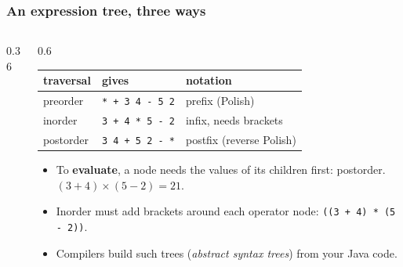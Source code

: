 \documentclass[aspectratio=169,10pt,compress]{beamer}
\begin{document}
\begin{frame}[t,fragile] \frametitle{An expression tree, three ways}
  \begin{columns}[T]
    \begin{column}{0.36\textwidth}
      \begin{center}
      \end{center}
    \end{column}
    \begin{column}{0.6\textwidth}
      \begin{center}\small
      \begin{tabular}{lll}
        \toprule
        \textbf{traversal} & \textbf{gives}            & \textbf{notation} \\
        \midrule
        preorder           & \texttt{* + 3 4 - 5 2}    & prefix (Polish) \\
        inorder            & \texttt{3 + 4 * 5 - 2}    & infix, needs brackets \\
        postorder          & \texttt{3 4 + 5 2 - *}    & postfix (reverse Polish) \\
        \bottomrule
      \end{tabular}
      \end{center}
      \begin{itemize}\small
        \item To \textbf{evaluate}, a node needs the values of its children first: postorder. $(3 + 4) \times (5 - 2) = 21$.
        \item Inorder must add brackets around each operator node: \texttt{((3 + 4) * (5 - 2))}.
        \item Compilers build such trees (\emph{abstract syntax trees}) from your Java code.
      \end{itemize}
    \end{column}
  \end{columns}
\end{frame}
\end{document}
